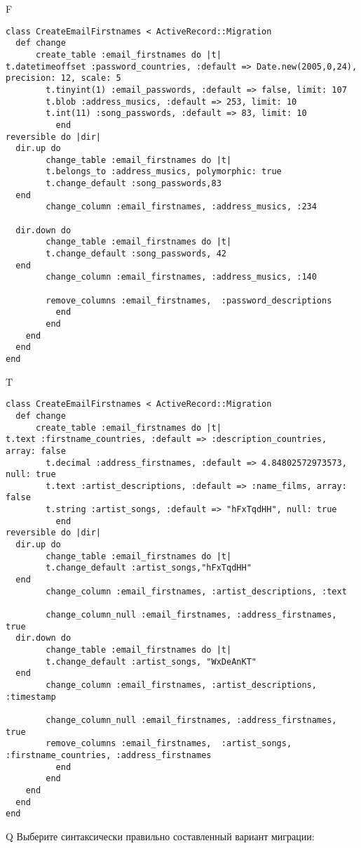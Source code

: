 F
\begin{verbatim}
class CreateEmailFirstnames < ActiveRecord::Migration
  def change
	  create_table :email_firstnames do |t|
t.datetimeoffset :password_countries, :default => Date.new(2005,0,24), precision: 12, scale: 5
		t.tinyint(1) :email_passwords, :default => false, limit: 107
		t.blob :address_musics, :default => 253, limit: 10
		t.int(11) :song_passwords, :default => 83, limit: 10
		  end
reversible do |dir|
  dir.up do
		change_table :email_firstnames do |t|
		t.belongs_to :address_musics, polymorphic: true
 		t.change_default :song_passwords,83
  end
 		change_column :email_firstnames, :address_musics, :234
   
  dir.down do
		change_table :email_firstnames do |t|
		t.change_default :song_passwords, 42
  end
 		change_column :email_firstnames, :address_musics, :140
   
		remove_columns :email_firstnames,  :password_descriptions 
	      end
	    end
    end 
  end
end

\end{verbatim}

T
\begin{verbatim}
class CreateEmailFirstnames < ActiveRecord::Migration
  def change
	  create_table :email_firstnames do |t|
t.text :firstname_countries, :default => :description_countries, array: false
		t.decimal :address_firstnames, :default => 4.84802572973573, null: true
		t.text :artist_descriptions, :default => :name_films, array: false
		t.string :artist_songs, :default => "hFxTqdHH", null: true
		  end
reversible do |dir|
  dir.up do
		change_table :email_firstnames do |t|
		t.change_default :artist_songs,"hFxTqdHH"
  end
 		change_column :email_firstnames, :artist_descriptions, :text
   
		change_column_null :email_firstnames, :address_firstnames,  true
  dir.down do
		change_table :email_firstnames do |t|
		t.change_default :artist_songs, "WxDeAnKT"
  end
 		change_column :email_firstnames, :artist_descriptions, :timestamp
   
		change_column_null :email_firstnames, :address_firstnames, true
 		remove_columns :email_firstnames,  :artist_songs, :firstname_countries, :address_firstnames 
	      end
	    end
    end 
  end
end

\end{verbatim}

Q
Выберите синтаксически правильно составленный вариант миграции:

